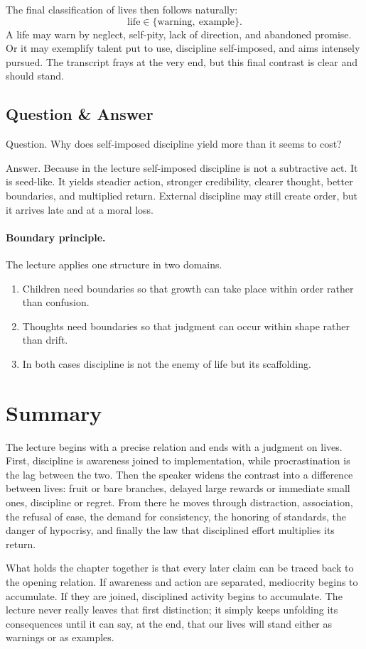 The final classification of lives then follows naturally:
\begin{equation}
\text{life} \in \{\text{warning},\ \text{example}\}.
\end{equation}
A life may warn by neglect, self-pity, lack of direction, and abandoned promise. Or it may exemplify talent put to use, discipline self-imposed, and aims intensely pursued. The transcript frays at the very end, but this final contrast is clear and should stand.

\subsection{Question \& Answer}

Question. Why does self-imposed discipline yield more than it seems to cost?

Answer. Because in the lecture self-imposed discipline is not a subtractive act. It is seed-like. It yields steadier action, stronger credibility, clearer thought, better boundaries, and multiplied return. External discipline may still create order, but it arrives late and at a moral loss.

\paragraph{Boundary principle.}
The lecture applies one structure in two domains.
\begin{enumerate}
\item Children need boundaries so that growth can take place within order rather than confusion.
\item Thoughts need boundaries so that judgment can occur within shape rather than drift.
\item In both cases discipline is not the enemy of life but its scaffolding.
\end{enumerate}

\section{Summary}

The lecture begins with a precise relation and ends with a judgment on lives. First, discipline is awareness joined to implementation, while procrastination is the lag between the two. Then the speaker widens the contrast into a difference between lives: fruit or bare branches, delayed large rewards or immediate small ones, discipline or regret. From there he moves through distraction, association, the refusal of ease, the demand for consistency, the honoring of standards, the danger of hypocrisy, and finally the law that disciplined effort multiplies its return.

What holds the chapter together is that every later claim can be traced back to the opening relation. If awareness and action are separated, mediocrity begins to accumulate. If they are joined, disciplined activity begins to accumulate. The lecture never really leaves that first distinction; it simply keeps unfolding its consequences until it can say, at the end, that our lives will stand either as warnings or as examples.